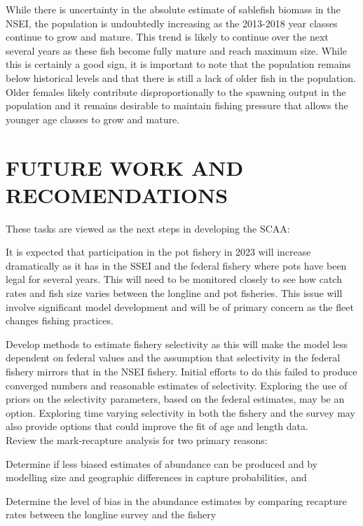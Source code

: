 \documentclass[
]{article}
\begin{document}
While there is uncertainty in the absolute estimate of sablefish biomass
in the NSEI, the population is undoubtedly increasing as the 2013-2018
year classes continue to grow and mature. This trend is likely to
continue over the next several years as these fish become fully mature
and reach maximum size. While this is certainly a good sign, it is
important to note that the population remains below historical levels
and that there is still a lack of older fish in the population. Older
females likely contribute disproportionally to the spawning output in
the population and it remains desirable to maintain fishing pressure
that allows the younger age classes to grow and mature.

\hypertarget{future-work-and-recomendations}{%
\section{FUTURE WORK AND
RECOMENDATIONS}\label{future-work-and-recomendations}}

These tasks are viewed as the next steps in developing the SCAA:

It is expected that participation in the pot fishery in 2023 will
increase dramatically as it has in the SSEI and the federal fishery
where pots have been legal for several years. This will need to be
monitored closely to see how catch rates and fish size varies between
the longline and pot fisheries. This issue will involve significant
model development and will be of primary concern as the fleet changes
fishing practices.

Develop methods to estimate fishery selectivity as this will make the
model less dependent on federal values and the assumption that
selectivity in the federal fishery mirrors that in the NSEI fishery.
Initial efforts to do this failed to produce converged numbers and
reasonable estimates of selectivity. Exploring the use of priors on the
selectivity parameters, based on the federal estimates, may be an
option. Exploring time varying selectivity in both the fishery and the
survey may also provide options that could improve the fit of age and
length data.\\

Review the mark-recapture analysis for two primary reasons:

Determine if less biased estimates of abundance can be produced and by
modelling size and geographic differences in capture probabilities, and

Determine the level of bias in the abundance estimates by comparing
recapture rates between the longline survey and the fishery
\end{document}
